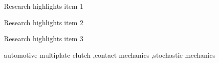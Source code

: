 \documentclass[a4paper,fleqn]{cas-dc}
\begin{document}

\begin{abstract}
judder in plate clutch in MBS simulation. characteristic of plate clutch and relevant dynamic phenomenon: many contacts, surface deviations after production. MBS simulation with parameter spread. statistical methods for evaluation of results. Plate mount position (\emph{matching}), parameter influences, 

\noindent\texttt{\textbackslash begin{abstract}} \dots 
\texttt{\textbackslash end{abstract}} and
\verb+\begin{keyword}+ \verb+...+ \verb+\end{keyword}+ 
which
contain the abstract and keywords respectively. 

\noindent Each keyword shall be separated by a \verb+\sep+ command.
\end{abstract}


\begin{highlights}
\item Research highlights item 1
\item Research highlights item 2
\item Research highlights item 3
\end{highlights}

\begin{keywords}
automotive multiplate clutch \sep contact mechanics \sep stochastic mechanics
\end{keywords}


\maketitle
\end{document}
